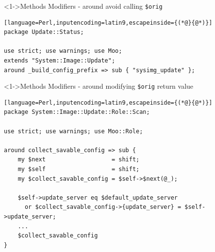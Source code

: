\documentclass[ngerman,xcolor={table,dvipsnames},smaller,compress,hyperref={bookmarks,colorlinks}]{beamer}%
\begin{document}
\begin{frame}[t,fragile]

\begin{block}<1->{Methods Modifiers - around avoid calling \texttt{\$orig}}
\scriptsize
\begin{lstlisting}[language=Perl,inputencoding=latin9,escapeinside={(*@}{@*)}]
package Update::Status;

use strict; use warnings; use Moo;
extends "System::Image::Update";
around _build_config_prefix => sub { "sysimg_update" };
\end{lstlisting}
\end{block}

\begin{itemize}
\end{itemize}

\end{frame}

\begin{frame}[t,fragile]

\begin{block}<1->{Methods Modifiers - around modifying \texttt{\$orig} return value}
\scriptsize
\begin{lstlisting}[language=Perl,inputencoding=latin9,escapeinside={(*@}{@*)}]
package System::Image::Update::Role::Scan;

use strict; use warnings; use Moo::Role;

around collect_savable_config => sub {
    my $next                   = shift;
    my $self                   = shift;
    my $collect_savable_config = $self->$next(@_);

    $self->update_server eq $default_update_server
      or $collect_savable_config->{update_server} = $self->update_server;
    ...
    $collect_savable_config
}
\end{lstlisting}
\end{block}

\begin{itemize}
\end{itemize}

\end{frame}
\end{document}
